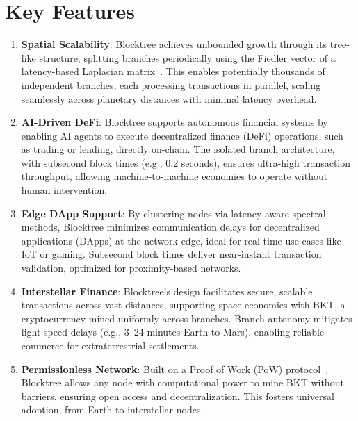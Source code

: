 \section{Key Features}
\begin{enumerate}
    \item \textbf{Spatial Scalability}: Blocktree achieves unbounded growth through its tree-like structure, splitting branches periodically using the Fiedler vector of a latency-based Laplacian matrix~\cite{ng2001spectral}. This enables potentially thousands of independent branches, each processing transactions in parallel, scaling seamlessly across planetary distances with minimal latency overhead.

    \item \textbf{AI-Driven DeFi}: Blocktree supports autonomous financial systems by enabling AI agents to execute decentralized finance (DeFi) operations, such as trading or lending, directly on-chain. The isolated branch architecture, with subsecond block times (e.g., 0.2 seconds), ensures ultra-high transaction throughput, allowing machine-to-machine economies to operate without human intervention.

    \item \textbf{Edge DApp Support}: By clustering nodes via latency-aware spectral methods, Blocktree minimizes communication delays for decentralized applications (DApps) at the network edge, ideal for real-time use cases like IoT or gaming. Subsecond block times deliver near-instant transaction validation, optimized for proximity-based networks.

    \item \textbf{Interstellar Finance}: Blocktree’s design facilitates secure, scalable transactions across vast distances, supporting space economies with BKT, a cryptocurrency mined uniformly across branches. Branch autonomy mitigates light-speed delays (e.g., 3–24 minutes Earth-to-Mars), enabling reliable commerce for extraterrestrial settlements.

    \item \textbf{Permissionless Network}: Built on a Proof of Work (PoW) protocol~\cite{nakamoto2008bitcoin}, Blocktree allows any node with computational power to mine BKT without barriers, ensuring open access and decentralization. This fosters universal adoption, from Earth to interstellar nodes.
\end{enumerate}